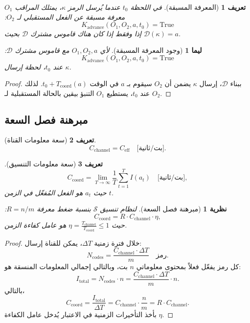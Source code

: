 \documentclass[11pt,a4paper]{article}
\newtheorem{theorem}{نظرية}
\newtheorem{lemma}{ليما}
\newtheorem{definition}{تعريف}
\begin{document}
	\begin{definition}[المعرفة المسبقة]
		في اللحظة $t_0$ عندما يُرسل الرمز $\kappa$، يمتلك المراقب $O_1$ معرفة مسبقة عن الفعل المستقبلي لـ $O_2$:
		\[
		K_{\text{advance}}(O_1, O_2, a, t_0) = \text{True}
		\]
		إذا وفقط إذا كان هناك قاموس مشترك $\mathcal{D}$ بحيث $\mathcal{D}(\kappa) = a$.
	\end{definition}
	
	\begin{lemma}[وجود المعرفة المسبقة]
		\label{lem:advance-knowledge}
		لأي $O_1, O_2, a$ مع قاموس مشترك $\mathcal{D}$:
		\[
		K_{\text{advance}}(O_1, O_2, a, t_0) = \text{True}
		\]
		عند $t_0$، لحظة إرسال $\kappa$.
	\end{lemma}
	
	\begin{proof}
		ببناء $\mathcal{D}$، إرسال $\kappa$ يضمن أن $O_2$ سيقوم بـ $a$ في الوقت $t_0 + T_{\text{coord}}(a)$. لذلك عند $t_0$، يستطيع $O_1$ التنبؤ بيقين بالحالة المستقبلية لـ $O_2$.
	\end{proof}
	
	\subsection{مبرهنة فصل السعة}
	
	\begin{definition}[سعة معلومات القناة]
		\[
		C_{\text{channel}} = C_{\text{eff}} \quad \text{[بت/ثانية]}.
		\]
	\end{definition}
	
	\begin{definition}[سعة معلومات التنسيق]
		\[
		C_{\text{coord}} = \lim_{T \to \infty} \frac{1}{T} \sum_{t=1}^{T} I(a_t) \quad \text{[بت/ثانية]},
		\]
		حيث $a_t$ هو الفعل المُفعّل في الزمن $t$.
	\end{definition}
	
	\begin{theorem}[مبرهنة فصل السعة]
		\label{thm:capacity-separation}
		لنظام تنسيق $\mathcal{S}$ بنسبة ضغط معرفة $R = n/m$:
		\[
		C_{\text{coord}} = R \cdot C_{\text{channel}} \cdot \eta,
		\]
		حيث $\eta = \frac{T_{\text{channel}}}{T_{\text{coord}}} \leq 1$ هو عامل كفاءة الزمن.
	\end{theorem}
	
	\begin{proof}
		خلال فترة زمنية $\Delta T$، يمكن للقناة إرسال:
		\[
		N_{\text{codes}} = \frac{C_{\text{channel}} \cdot \Delta T}{m} \quad \text{رمز}.
		\]
		كل رمز يفعّل فعلاً بمحتوى معلوماتي $n$ بت، وبالتالي إجمالي المعلومات المنسقة هو:
		\[
		I_{\text{total}} = N_{\text{codes}} \cdot n = \frac{C_{\text{channel}} \cdot \Delta T}{m} \cdot n.
		\]
		بالتالي،
		\[
		C_{\text{coord}} = \frac{I_{\text{total}}}{\Delta T} = C_{\text{channel}} \cdot \frac{n}{m} = R \cdot C_{\text{channel}}.
		\]
		بأخذ التأخيرات الزمنية في الاعتبار يُدخل عامل الكفاءة $\eta$.
	\end{proof}
	
\end{document}

